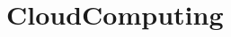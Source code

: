 \chapter{Cloud\+Computing}
\hypertarget{md__r_e_a_d_m_e}{}\label{md__r_e_a_d_m_e}
\label{md__r_e_a_d_m_e_autotoc_md0}%
%
